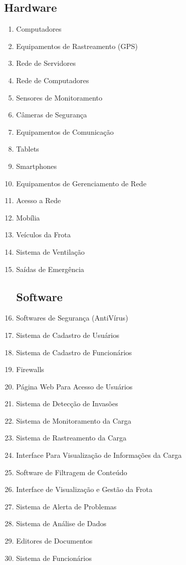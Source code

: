 \subsection{Hardware}
\begin{enumerate}
	\item Computadores
	\item Equipamentos de Rastreamento (GPS)
	\item Rede de Servidores
	\item Rede de Computadores
	\item Sensores de Monitoramento
	\item Câmeras de Segurança
	\item Equipamentos de Comunicação
	\item Tablets
	\item Smartphones
	\item Equipamentos de Gerenciamento de Rede
	\item Acesso a Rede
	\item Mobília
	\item Veículos da Frota
	\item Sistema de Ventilação
	\item Saídas de Emergência
	
	\subsection{Software}
	\item Softwares de Segurança (AntiVírus)
	\item Sistema de Cadastro de Usuários
	\item Sistema de Cadastro de Funcionários
	\item Firewalls
	\item Página Web Para Acesso de Usuários
	\item Sistema de Detecção de Invasões
	\item Sistema de Monitoramento da Carga
	\item Sistema de Rastreamento da Carga
	\item Interface Para Visualização de Informações da Carga
	\item Software de Filtragem de Conteúdo 
	\item Interface de Visualização e Gestão da Frota
	\item Sistema de Alerta de Problemas
	\item Sistema de Análise de Dados
	\item Editores de Documentos
	\item Sistema de Funcionários
	

\end{enumerate}
